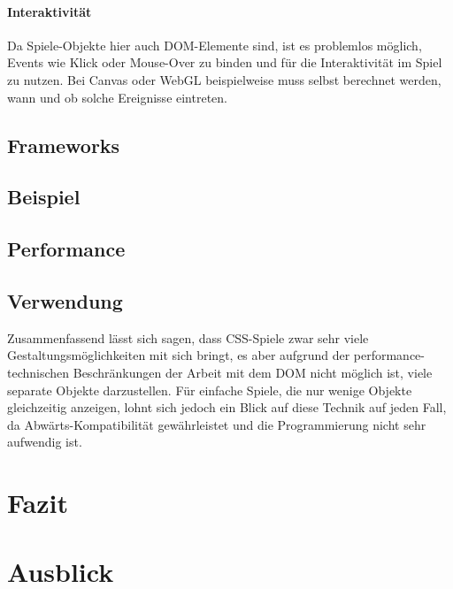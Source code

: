 \documentclass[a4paper, 12pt]{article}
\begin{document}
\paragraph{Interaktivität} Da Spiele-Objekte hier auch DOM-Elemente sind, ist es problemlos möglich, Events wie Klick oder Mouse-Over zu binden und für die Interaktivität im Spiel zu nutzen. Bei Canvas oder WebGL beispielweise muss selbst berechnet werden, wann und ob solche Ereignisse eintreten.
\subsection{Frameworks}
\subsection{Beispiel}
\subsection{Performance}
\subsection{Verwendung} Zusammenfassend lässt sich sagen, dass CSS-Spiele zwar sehr viele Gestaltungsmöglichkeiten mit sich bringt, es aber aufgrund der performance-technischen Beschränkungen der Arbeit mit dem DOM nicht möglich ist, viele separate Objekte darzustellen. Für einfache Spiele, die nur wenige Objekte gleichzeitig anzeigen, lohnt sich jedoch ein Blick auf diese Technik auf jeden Fall, da Abwärts-Kompatibilität gewährleistet und die Programmierung nicht sehr aufwendig ist.
\section{Fazit}
\section{Ausblick}
\end{document}
